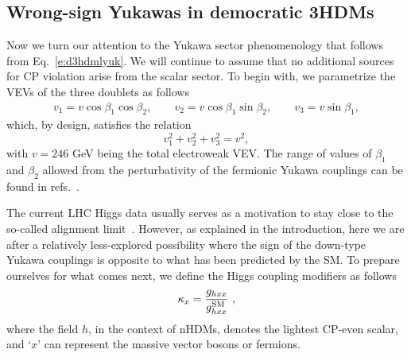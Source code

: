 \documentclass[11pt]{article}
\begin{document}
\subsection{Wrong-sign Yukawas in democratic 3HDMs}
\label{s:WS}
%
Now we turn our attention to the Yukawa sector phenomenology that follows from Eq.~\eqref{e:d3hdmlyuk}.  
We will continue to assume that no additional sources for CP violation arise from the scalar sector.  
To begin with, we parametrize the VEVs of the three doublets as follows
%
\begin{eqnarray}
v_1 = v \cos\beta_1 \cos\beta_2 , \qquad v_2 = v \cos\beta_1\sin\beta_2, \qquad v_3= v \sin\beta_1,
\end{eqnarray}
%
which, by design, satisfies the relation
\begin{equation}
v_1^2+v_2^2+v_3^2 = v^2, 
\end{equation}
with $v=246$ GeV being the total electroweak VEV.  
The range of values of $\beta_1$ and $\beta_2$ allowed from the perturbativity of the fermionic Yukawa couplings can be found in refs.~\cite{Boto:2021qgu,Chakraborti:2021bpy}.  

The current LHC Higgs data usually serves as a motivation to stay close to the so-called alignment limit~\cite{Das:2019yad}.  
However, as explained in the introduction, here we are after a relatively less-explored possibility where the sign of the down-type Yukawa couplings is opposite to what has been predicted by the SM.  
To prepare ourselves for what comes next, we define the Higgs coupling modifiers as follows~\cite{LHCHiggsCrossSectionWorkingGroup:2012nn, LHCHiggsCrossSectionWorkingGroup:2013rie}
%
\begin{eqnarray}
\kappa_x = \frac{g_{hxx}}{g_{hxx}^{\rm SM}}\, \, ,
\end{eqnarray}
%
where the field $h$, in the context of nHDMs, denotes the lightest CP-even scalar, and `$x$' can represent the massive vector bosons or fermions.  
\end{document}
